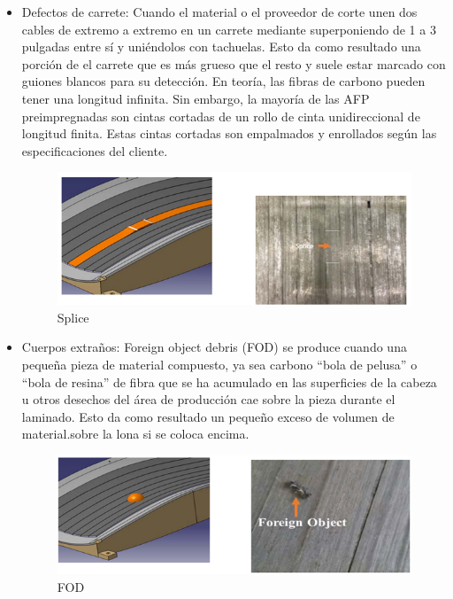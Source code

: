 \begin{itemize}
\item Defectos de carrete: Cuando el material o el proveedor de corte unen dos cables de extremo a extremo en un carrete mediante superponiendo de 1 a 3 pulgadas entre sí y uniéndolos con tachuelas. Esto da como resultado una porción de el carrete que es más grueso que el resto y suele estar marcado con guiones blancos para su detección. En teoría, las fibras de carbono pueden tener una longitud infinita. Sin embargo, la mayoría de las AFP preimpregnadas son cintas cortadas de un rollo de cinta unidireccional de longitud finita. Estas cintas cortadas son empalmados y enrollados según las especificaciones del cliente.

\begin{figure}[H]
    \centering
    \includegraphics[width=0.9\linewidth]{drei.png}
    \caption{Splice}
    \label{fig:enter-label}
\end{figure}


\item Cuerpos extraños: Foreign object debris (FOD) se produce cuando una pequeña pieza de material compuesto, ya sea carbono “bola de pelusa” o “bola de resina” de fibra que se ha acumulado en las superficies de la cabeza u otros desechos del área de producción cae sobre la pieza durante el laminado. Esto da como resultado un pequeño exceso de volumen de material.sobre la lona si se coloca encima.

\begin{figure}[H]
    \centering
    \includegraphics[width=0.9\linewidth]{vier.png}
    \caption{FOD}
    \label{fig:enter-label}
\end{figure}
\end{itemize}

